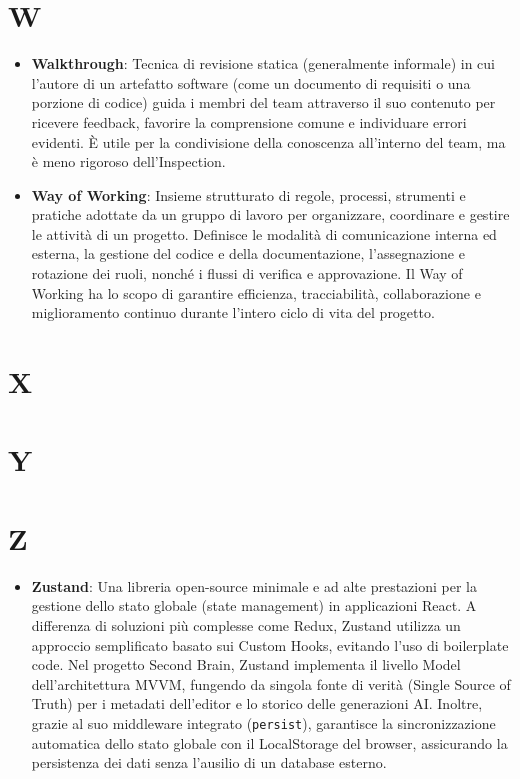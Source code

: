 \documentclass[11pt,a4paper]{article}
\begin{document}
\section*{W}
\begin{itemize}
\item \textbf{Walkthrough}: Tecnica di revisione statica (generalmente informale) in cui l'autore di un artefatto software (come un documento di requisiti o una porzione di codice) guida i membri del team attraverso il suo contenuto per ricevere feedback, favorire la comprensione comune e individuare errori evidenti. È utile per la condivisione della conoscenza all'interno del team, ma è meno rigoroso dell'Inspection.

\item \textbf{Way of Working}: Insieme strutturato di regole, processi, strumenti e pratiche adottate da un gruppo di lavoro per organizzare, coordinare e gestire le attività di un progetto. Definisce le modalità di comunicazione interna ed esterna, la gestione del codice e della documentazione, l’assegnazione e rotazione dei ruoli, nonché i flussi di verifica e approvazione. Il Way of Working ha lo scopo di garantire efficienza, tracciabilità, collaborazione e miglioramento continuo durante l’intero ciclo di vita del progetto.

\end{itemize}

\newpage

\section*{X}

\newpage

\section*{Y}

\newpage

\section*{Z}
\begin{itemize}
\item \textbf{Zustand}: Una libreria open-source minimale e ad alte prestazioni per la gestione dello stato globale (state management) in applicazioni React. A differenza di soluzioni più complesse come Redux, Zustand utilizza un approccio semplificato basato sui Custom Hooks, evitando l'uso di boilerplate code. Nel progetto Second Brain, Zustand implementa il livello Model dell'architettura MVVM, fungendo da singola fonte di verità (Single Source of Truth) per i metadati dell'editor e lo storico delle generazioni AI. Inoltre, grazie al suo middleware integrato (\texttt{persist}), garantisce la sincronizzazione automatica dello stato globale con il LocalStorage del browser, assicurando la persistenza dei dati senza l'ausilio di un database esterno.
\end{itemize}

\newpage
\end{document}
